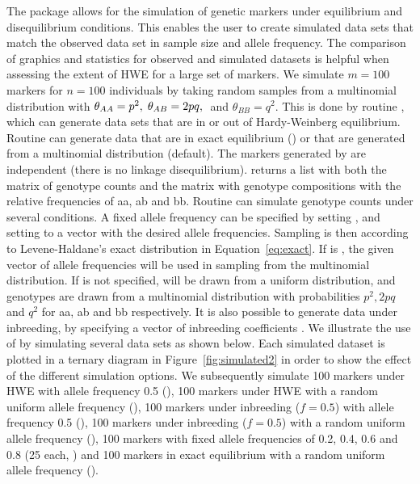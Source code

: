 \documentclass[nojss]{jss}
\begin{document}
The package  allows for the simulation of genetic
markers under equilibrium and disequilibrium conditions. This enables
the user to create simulated data sets that match the observed data
set in sample size and allele frequency. The comparison of graphics
and statistics for observed and simulated datasets is helpful when
assessing the extent of HWE for a large set of markers.  We simulate
$m=100$ markers for $n=100$ individuals by taking random samples from
a multinomial distribution with $\theta_{AA} = p^2, \hspace{1mm}
\theta_{AB} = 2pq, \hspace{1mm}$ and $\theta_{BB} = q^2$. This is done
by routine , which can generate data sets that are in or
out of Hardy-Weinberg equilibrium. Routine  can generate
data that are in exact equilibrium () or
that are generated from a multinomial distribution (default).  The
markers generated by  are independent (there is no
linkage disequilibrium).   returns a list with both the
matrix of genotype counts  and the matrix with genotype
compositions  with the relative frequencies of {\sc aa, ab}
and {\sc bb}.  Routine  can simulate genotype counts
under several conditions. A fixed allele frequency can be specified by
setting , and setting  to a vector with
the desired allele frequencies.  Sampling is then according to
Levene-Haldane's exact distribution in Equation~\ref{eq:exact}. If
 is , the given vector  of allele
frequencies will be used in sampling from the multinomial
distribution. If  is not specified,  will be drawn
from a uniform distribution, and genotypes are drawn from a
multinomial distribution with probabilities $p^2, 2pq$ and $q^2$ for
{\sc aa}, {\sc ab} and {\sc bb} respectively. It is also possible to
generate data under inbreeding, by specifying a vector of inbreeding
coefficients .  We illustrate the use of  by
simulating several data sets as shown below. Each simulated dataset is
plotted in a ternary diagram in Figure~\ref{fig:simulated2} in order to
show the effect of the different simulation options. We subsequently
simulate 100 markers under HWE with allele frequency 0.5 (),
100 markers under HWE with a random uniform allele frequency
(), 100 markers under inbreeding ($f = 0.5$) with allele
frequency 0.5 (), 100 markers under inbreeding ($f=0.5$) with
a random uniform allele frequency (), 100 markers with fixed
allele frequencies of 0.2, 0.4, 0.6 and 0.8 (25 each, ) and
100 markers in exact equilibrium with a random uniform allele
frequency ().
%
\end{document}
